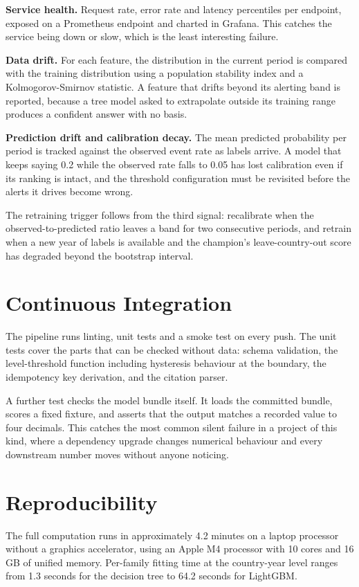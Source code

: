 \documentclass[10pt,openany]{report}
\begin{document}
\textbf{Service health.} Request rate, error rate and latency percentiles per endpoint, exposed on
a Prometheus endpoint and charted in Grafana. This catches the service being down or slow, which
is the least interesting failure.

\textbf{Data drift.} For each feature, the distribution in the current period is compared with the
training distribution using a population stability index and a Kolmogorov-Smirnov statistic. A
feature that drifts beyond its alerting band is reported, because a tree model asked to
extrapolate outside its training range produces a confident answer with no basis.

\textbf{Prediction drift and calibration decay.} The mean predicted probability per period is
tracked against the observed event rate as labels arrive. A model that keeps saying 0.2 while the
observed rate falls to 0.05 has lost calibration even if its ranking is intact, and the threshold
configuration must be revisited before the alerts it drives become wrong.

The retraining trigger follows from the third signal: recalibrate when the observed-to-predicted
ratio leaves a band for two consecutive periods, and retrain when a new year of labels is
available and the champion's leave-country-out score has degraded beyond the bootstrap interval.

\section{Continuous Integration}

The pipeline runs linting, unit tests and a smoke test on every push. The unit tests cover the
parts that can be checked without data: schema validation, the level-threshold function including
hysteresis behaviour at the boundary, the idempotency key derivation, and the citation parser.

A further test checks the model bundle itself. It loads the committed bundle, scores a fixed
fixture, and asserts that the output matches a recorded value to four decimals. This catches the
most common silent failure in a project of this kind, where a dependency upgrade changes
numerical behaviour and every downstream number moves without anyone noticing.

\section{Reproducibility}

The full computation runs in approximately 4.2 minutes on a laptop processor without a
graphics accelerator, using an Apple M4 processor with 10 cores and 16 GB of unified memory. Per-family fitting time at the country-year level ranges
from 1.3 seconds for the decision tree to 64.2 seconds for LightGBM.
\end{document}
